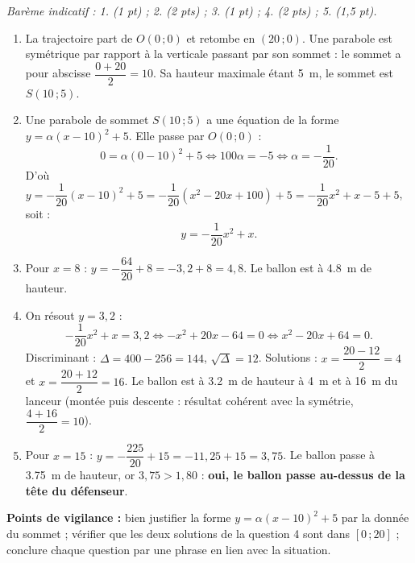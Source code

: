 \documentclass[11pt]{article}
\begin{document}
\begin{corrige}
\emph{Barème indicatif : 1. (1 pt) ; 2. (2 pts) ; 3. (1 pt) ; 4. (2 pts) ; 5. (1,5 pt).}
\begin{enumerate}
\item La trajectoire part de $O(0\,;0)$ et retombe en $(20\,;0)$. Une parabole est symétrique par rapport à la verticale passant par son sommet : le sommet a pour abscisse $\dfrac{0+20}{2}=10$. Sa hauteur maximale étant \SI{5}{m}, le sommet est $S(10\,;5)$.
\item Une parabole de sommet $S(10\,;5)$ a une équation de la forme $y=\alpha(x-10)^{2}+5$. Elle passe par $O(0\,;0)$ :
\[ 0=\alpha(0-10)^{2}+5 \iff 100\alpha=-5 \iff \alpha=-\dfrac{1}{20}. \]
D'où $y=-\dfrac{1}{20}(x-10)^{2}+5=-\dfrac{1}{20}(x^{2}-20x+100)+5=-\dfrac{1}{20}x^{2}+x-5+5$, soit :
\[ y=-\dfrac{1}{20}x^{2}+x. \]
\item Pour $x=8$ : $y=-\dfrac{64}{20}+8=-3,2+8=4,8$. Le ballon est à \SI{4,8}{m} de hauteur.
\item On résout $y=3,2$ :
\[ -\dfrac{1}{20}x^{2}+x=3,2 \iff -x^{2}+20x-64=0 \iff x^{2}-20x+64=0. \]
Discriminant : $\Delta=400-256=144$, $\sqrt{\Delta}=12$. Solutions : $x=\dfrac{20-12}{2}=4$ et $x=\dfrac{20+12}{2}=16$. Le ballon est à \SI{3,2}{m} de hauteur à \SI{4}{m} et à \SI{16}{m} du lanceur (montée puis descente : résultat cohérent avec la symétrie, $\dfrac{4+16}{2}=10$).
\item Pour $x=15$ : $y=-\dfrac{225}{20}+15=-11,25+15=3,75$. Le ballon passe à \SI{3,75}{m} de hauteur, or $3,75>1,80$ : \textbf{oui, le ballon passe au-dessus de la tête du défenseur}.
\end{enumerate}
\textbf{Points de vigilance :} bien justifier la forme $y=\alpha(x-10)^{2}+5$ par la donnée du sommet ; vérifier que les deux solutions de la question 4 sont dans $[0\,;20]$ ; conclure chaque question par une phrase en lien avec la situation.
\end{corrige}
\end{document}
